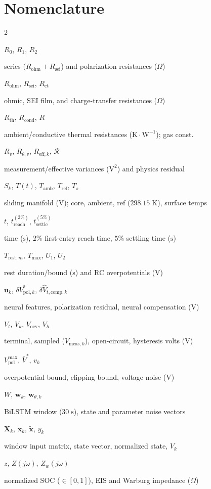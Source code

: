 \documentclass[10pt,a4paper]{article}
\newcommand{\entry}[2]{\noindent\parbox[t]{0.31\columnwidth}{\raggedright #1}\parbox[t]{0.67\columnwidth}{\raggedright #2}\par\vspace{2pt}}
\newenvironment{nomenclature}{\section*{Nomenclature}\begin{multicols}{2}\footnotesize}{\end{multicols}\vspace{0.4em}}
\begin{document}
\begin{nomenclature}
\entry{$R_0$, $R_1$, $R_2$}{series ($R_{\text{ohm}} + R_{\text{sei}}$) and polarization resistances ($\Omega$)}
\entry{$R_{\text{ohm}}$, $R_{\text{sei}}$, $R_{\text{ct}}$}{ohmic, SEI film, and charge-transfer resistances ($\Omega$)}
\entry{$R_{\text{th}}$, $R_{\text{cond}}$, $R$}{ambient/conductive thermal resistances ($\text{K}\cdot\text{W}^{-1}$); gas const.}
\entry{$R_v$, $R_{\theta,v}$, $R_{\text{eff},k}$, $\mathcal{R}$}{measurement/effective variances ($\text{V}^2$) and physics residual}
\entry{$S_k$, $T(t)$, $T_{\text{amb}}$, $T_{\text{ref}}$, $T_s$}{sliding manifold ($\text{V}$); core, ambient, ref ($298.15\;\text{K}$), surface temps}
\entry{$t$, $t_{\text{reach}}^{(2\%)}$, $t_{\text{settle}}^{(5\%)}$}{time ($\text{s}$), $2\%$ first-entry reach time, $5\%$ settling time ($\text{s}$)}
\entry{$T_{\text{rest},m}$, $T_{\max}$, $U_1$, $U_2$}{rest duration/bound ($\text{s}$) and RC overpotentials ($\text{V}$)}
\entry{$\mathbf{u}_k$, $\delta V_{\text{pol},k}^*$, $\delta\hat{V}_{t,\text{comp},k}$}{neural features, polarization residual, neural compensation ($\text{V}$)}
\entry{$V_t$, $V_k$, $V_{\text{ocv}}$, $V_h$}{terminal, sampled ($V_{\text{meas},k}$), open-circuit, hysteresis volts ($\text{V}$)}
\entry{$V_{\text{pol}}^{\max}$, $\bar{V}^*$, $v_k$}{overpotential bound, clipping bound, voltage noise ($\text{V}$)}
\entry{$W$, $\mathbf{w}_k$, $\mathbf{w}_{\theta,k}$}{BiLSTM window ($30\;\text{s}$), state and parameter noise vectors}
\entry{$\mathbf{X}_k$, $\mathbf{x}_k$, $\tilde{\mathbf{x}}$, $y_k$}{window input matrix, state vector, normalized state, $V_k$}
\entry{$z$, $Z(j\omega)$, $Z_w(j\omega)$}{normalized SOC ($\in [0, 1]$), EIS and Warburg impedance ($\Omega$)}


\end{nomenclature}
\end{document}
